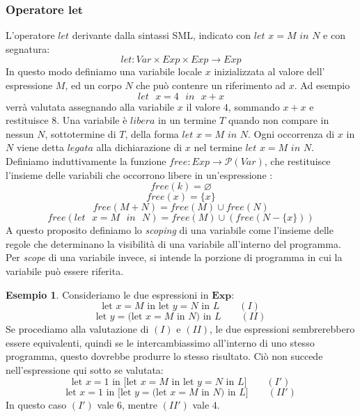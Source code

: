 \documentclass{article}
\theoremstyle{definition}
\theoremstyle{definition}
\theoremstyle{definition}
\newtheorem{example}[theorem]{Esempio}
\theoremstyle{remark}
\begin{document}
\subsubsection{Operatore $\boldsymbol{let}$}
L'operatore $let$ derivante dalla sintassi SML, indicato con $let$ $x=M$ $in$ $N$ e con segnatura:
$$let : Var \times Exp\times Exp\to Exp$$
In questo modo definiamo una variabile locale $x$ inizializzata al valore dell' espressione $M$, ed un corpo $N$ che può contenre un riferimento ad $x$. Ad esempio
$$\text{$let$ $x=4$ $in$ $x+x$}$$
verrà valutata assegnando alla variabile $x$ il valore $4$, sommando $x+x$ e restituisce $8$.
Una variabile  è $libera$ in un termine $T$ quando non compare in nessun $N$, sottotermine di $T$, della forma $let$ $x=M$ $in$ $N$.
Ogni occorrenza di $x$ in $N$ viene detta $legata$ alla dichiarazione di $x$ nel termine $let$ $x=M$ $in$ $N$.
Definiamo induttivamente la funzione $free:Exp\to \mathcal{P}(Var)$, che restituisce l'insieme delle variabili  che occorrono libere in un'espressione :
$$free(k) = \varnothing$$
$$free(x) = \{x\}$$
$$free(M+N) = free(M)\cup free(N)$$
$$free(\text{$let$ $x=M$ $in$ $N$}) = free(M) \cup (free(N-\{x\}))$$
A questo proposito definiamo lo \textit{scoping} di una variabile come l'insieme delle regole che determinano la
visibilità di una variabile all'interno del programma. Per \textit{scope} di una variabile invece, si intende la porzione di programma in cui la
variabile può essere riferita.
\begin{example}
    Consideriamo le due espressioni in $\boldsymbol{Exp}$:
    $$\text{let $x=M$ in let $y=N$ in $L$}  \qquad(I)$$
    $$\text{let $y=$(let $x=M$ in $N$) in $L$}\qquad (II)$$
    Se procediamo alla valutazione di $(I)$ e $(II)$, le due espressioni
    sembrerebbero essere equivalenti, quindi se le intercambiassimo all'interno
    di uno stesso programma, questo dovrebbe produrre lo stesso risultato. Ciò non
    succede nell'espressione qui sotto se valutata:
    $$\text{let $x=1$ in [let $x=M$ in let $y=N$ in $L$]}  \qquad(I')$$
    $$\text{let $x=1$ in [let $y=$(let $x=M$ in $N$) in $L$]}\qquad (II')$$
    In questo caso $(I')$ vale $6$, mentre $(II')$ vale $4$.

\end{example}
\end{document}
